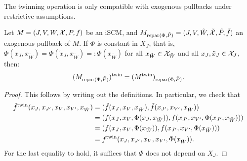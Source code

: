 The twinning operation is only compatible with exogenous pullbacks under restrictive assumptions.
\begin{Lem}\label{lem:twinning_exogenous_pullback_commute}
Let $M = \left ( J, V, W, \mathcal{X}, P, f \right )$ be an iSCM, and $M_{\mathrm{repar}({\Phi},{\tilde{P}})} = ( J, V, \tilde{W}, \tilde{\mathcal{X}}, \tilde{P}, \tilde{f} )$ an exogenous pullback of $M$.
If $\Phi$ is constant in $X_J$, that is, $\Phi(x_J,x_{\tilde{W}}) = \Phi(\tilde{x}_J,x_{\tilde{W}}) =: \Phi(x_{\tilde{W}})$ for all $x_{\tilde{W}} \in \mathcal{X}_{\tilde{W}}$ and all $x_J,\tilde{x}_J \in \mathcal{X}_J$, then:
  $$(M_{\mathrm{repar}({\Phi},{\tilde{P}})})^{\mathrm{twin}} = (M^{\mathrm{twin}})_{\mathrm{repar}({\Phi},{\tilde{P}})}.$$
\end{Lem}
\begin{proof}
  This follows by writing out the definitions. In particular, we check that
  \begin{equation*}\begin{split}
    \tilde{f}^{\mathrm{twin}}(x_J,x_{J'},x_V,x_{V'},x_{\tilde{W}}) 
    & = (\tilde{f}(x_J,x_V,x_{\tilde{W}}),\tilde{f}(x_{J'},x_{V'},x_{\tilde{W}})) \\
    & = (f(x_J,x_V,\Phi(x_J,x_{\tilde{W}})),f(x_{J'},x_{V'},\Phi(x_{J'},x_{\tilde{W}}))) \\
    & = (f(x_J,x_V,\Phi(x_{\tilde{W}})),f(x_{J'},x_{V'},\Phi(x_{\tilde{W}}))) \\
    & = f^{\mathrm{twin}}(x_J,x_{J'},x_V,x_{V'},\Phi(x_{\tilde{W}})).
  \end{split}\end{equation*}
  For the last equality to hold, it suffices that $\Phi$ does not depend on $X_J$.
\end{proof}

